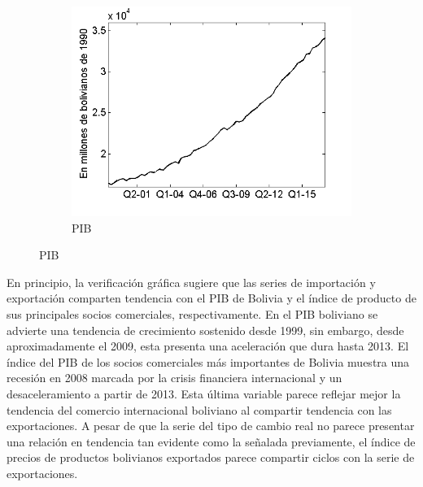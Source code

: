 \documentclass[12pt,letterpaper]{article}
\begin{document}
\begin{figure}
\begin{subfigure}[b]{0.4\textwidth}
        \includegraphics[width=\textwidth]{4pib}
        \caption{PIB}
        \label{4pib}
    \end{subfigure}
\end{figure}

En principio, la verificación gráfica sugiere que las series de importación y exportación comparten tendencia con el PIB de Bolivia y el índice de producto de sus principales socios comerciales, respectivamente. En el PIB boliviano se advierte una tendencia de crecimiento sostenido desde 1999, sin embargo, desde aproximadamente el 2009, esta presenta una aceleración que dura hasta 2013. El índice del PIB de los socios comerciales más importantes de Bolivia muestra una recesión en 2008 marcada por la crisis financiera internacional y un desaceleramiento a partir de 2013. Esta última variable parece reflejar mejor la tendencia del comercio internacional boliviano al compartir tendencia con las exportaciones. A pesar de que la serie del tipo de cambio real no parece presentar una relación en tendencia tan evidente como la señalada previamente, el índice de precios de productos bolivianos exportados parece compartir ciclos con la serie de exportaciones.
\end{document}
